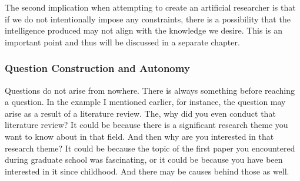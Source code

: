 \documentclass{book}
\begin{document}


The second implication when attempting to create an artificial researcher is that if we do not intentionally impose any constraints, there is a possibility that the intelligence produced may not align with the knowledge we desire. This is an important point and thus will be discussed in a separate chapter.

\subsubsection{Question Construction and Autonomy}

Questions do not arise from nowhere. There is always something before reaching a question. In the example I mentioned earlier, for instance, the question may arise as a result of a literature review. The, why did you even conduct that literature review? It could be because there is a significant research theme you want to know about in that field. And then why are you interested in that research theme? It could be because the topic of the first paper you encountered during graduate school was fascinating, or it could be because you have been interested in it since childhood. And there may be causes behind those as well.
\end{document}
